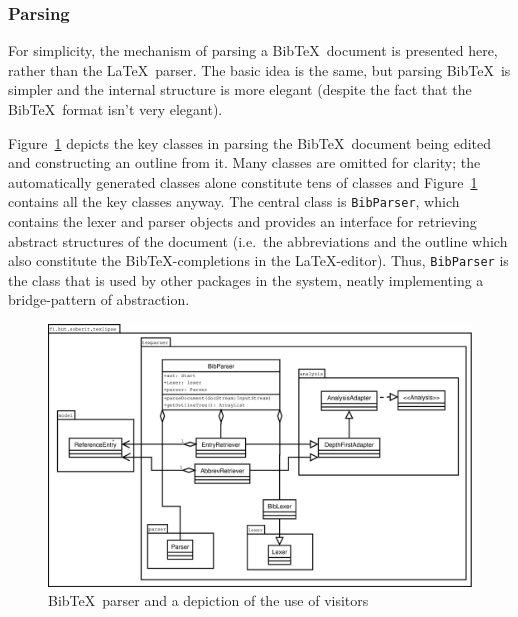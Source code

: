 \documentclass[a4paper,11pt,twoside]{article}
\begin{document}
\subsubsection{Parsing}
\label{sect:techparse}

For simplicity, the mechanism of parsing a Bib\TeX\ document is presented here, 
rather than the \LaTeX\ parser. The basic idea is the same, but parsing 
Bib\TeX\ is simpler and the internal structure is more elegant (despite the 
fact that the Bib\TeX\ format isn't very elegant).

Figure~\ref{fig:parserbib} depicts the key classes in parsing the Bib\TeX\ 
document being edited and constructing an outline from it. Many classes are 
omitted for clarity; the automatically generated classes alone constitute tens 
of classes and Figure~\ref{fig:parserbib} contains all the key classes anyway. 
The central class is \texttt{BibParser}, which contains the lexer and parser 
objects and provides an interface for retrieving abstract structures of the 
document (i.e.\ the abbreviations and the outline which also constitute the 
Bib\TeX -completions in the \LaTeX -editor). Thus, \texttt{BibParser} is the 
class that is used by other packages in the system, neatly implementing a
bridge-pattern of abstraction.


\begin{figure}[!htp]
\begin{center}
\includegraphics[width=12cm]{images/techbibparse}
\caption{Bib\TeX\ parser and a depiction of the use of visitors}
\label{fig:parserbib}
\end{center}
\end{figure}
\end{document}
